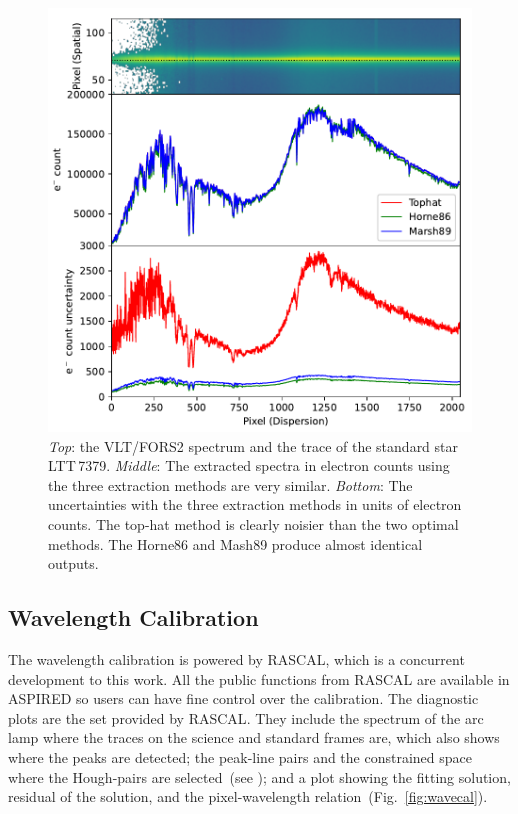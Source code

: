 \documentclass[linenumbers, twocolumn]{aastex631}
\begin{document}
\begin{figure}
    \centering
    \includegraphics[width=\columnwidth]{fig_04_extraction_compared.pdf}
    \caption{\textit{Top}: the VLT/FORS2 spectrum and the trace of the standard
    star LTT\,7379. \textit{Middle}: The extracted spectra in electron counts
    using the three extraction methods are very similar. \textit{Bottom}: The
    uncertainties with the three extraction methods in units of electron counts.
    The top-hat method is clearly noisier than the two optimal methods. The
    Horne86 and Mash89 produce almost identical outputs.}
    \label{fig:extraction_compared}
\end{figure}

\subsection{Wavelength Calibration}
The wavelength calibration is powered by \textsc{RASCAL}, which is a concurrent
development to this work. All the public functions from \textsc{RASCAL} are
available in \textsc{ASPIRED} so users can have fine control over the
calibration. The diagnostic plots are the set provided by \textsc{RASCAL}.
They include the spectrum of the arc lamp where the traces on the science and
standard frames are, which also shows where the peaks are detected; the
peak-line pairs and the constrained space where the Hough-pairs are
selected~(see \citealt{2020ASPC..527..627V}); and a plot showing the fitting
solution, residual of the solution, and the pixel-wavelength
relation~(Fig.~\ref{fig:wavecal}).
\end{document}

